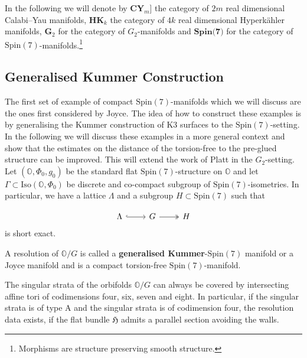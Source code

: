 \documentclass[psamsfonts]{amsart}
\theoremstyle{plain}
\theoremstyle{definition}{
\newtheorem{defi}{Definition}[section]
\newtheorem{ass}{Assumption}
\newtheorem*{nota}{Notation}}
\theoremstyle{remark}{
\newtheorem{rem}{Remark}
\newtheorem{ex}{Example}}
\theoremstyle{plain}{
\newtheorem{thm}{Theorem}[section]
\newtheorem{lem}{Lemma}[section]
\newtheorem{cor}{Corollary}[section]
\newtheorem{prop}{Proposition}[section]
\newtheorem{con}{Conjecture}[section]}
\newcommand{\m}[1]{{\mathrm{#1}}}
\newcommand{\cat}[1]{\textbf{#1}}
\begin{document}
\begin{nota}
In the following we will denote by $\cat{CY}_m$] the category of $2m$ real dimensional Calabi--Yau manifolds, $\cat{HK}_k$ the category of $4k$ real dimensional Hyperkähler manifolds, $\cat{G}_2$ for the category of $G_2$-manifolds and $\cat{Spin(7)}$ for the category of $\m{Spin}(7)$-manifolds.\footnote{Morphisms are structure preserving smooth structure.}
\end{nota}



\subsection{Generalised Kummer Construction}
\label{Generalsied Kummer Construction}

The first set of example of compact $\m{Spin}(7)$-manifolds which we will discuss are the ones first considered by Joyce\cite{Joyce1996b}. The idea of how to construct these examples is by generalising the Kummer construction of K3 surfaces to the $\m{Spin}(7)$-setting. In the following we will discuss these examples in a more general context and show that the estimates on the distance of the torsion-free to the pre-glued structure can be improved. This will extend the work of Platt \cite{platt} in the $G_2$-setting.\\

Let $(\mathbb{O},\Phi_{0},g_{0})$ be the standard flat $\m{Spin}(7)$-structure on $\mathbb{O}$ and let $\Gamma\subset\m{Iso}(\mathbb{O},\Phi_{0})$ be discrete and co-compact subgroup of $\m{Spin}(7)$-isometries. In particular, we have a lattice $\Lambda$ and a subgroup $H\subset\m{Spin}(7)$ such that

\begin{equation*}
    \begin{tikzcd}
        \Lambda\arrow[r,hook]&G\arrow[r, two heads]&H
    \end{tikzcd}
\end{equation*}
is short exact.

\begin{defi}
A resolution of $\mathbb{O}/G$ is called a \textbf{generalised Kummer}-$\m{Spin}(7)$ manifold or a Joyce manifold and is a compact torsion-free $\m{Spin}(7)$-manifold. 
\end{defi}


\begin{prop}
The singular strata of the orbifolds $\mathbb{O}/G$ can always be covered by intersecting affine tori of codimensions four, six, seven and eight. In particular, if the singular strata is of type A and the singular strata is of codimension four, the resolution data exists, if the flat bundle $\mathfrak{H}$ admits a parallel section avoiding the walls.
\end{prop}
\end{document}
